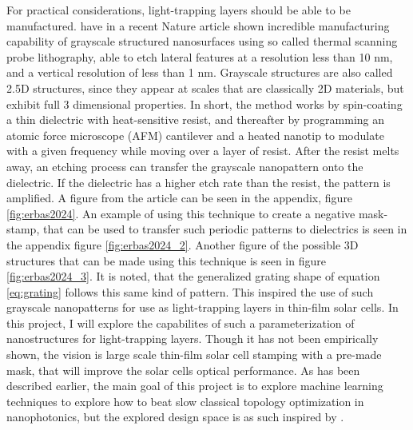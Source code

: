 For practical considerations, light-trapping layers should be able to be manufactured. \Cite{Erbas2024} have in a recent Nature article shown incredible manufacturing capability of grayscale structured nanosurfaces using so called thermal scanning probe lithography, able to etch lateral features at a resolution less than 10 nm, and a vertical resolution of less than 1 nm. Grayscale structures are also called 2.5D structures, since they appear at scales that are classically 2D materials, but exhibit full 3 dimensional properties.
In short, the method works by spin-coating a thin dielectric with heat-sensitive resist, and thereafter by programming an atomic force microscope (AFM) cantilever and a heated nanotip to modulate with a given frequency while moving over a layer of resist. After the resist melts away, an etching process can transfer the grayscale nanopattern onto the dielectric. If the dielectric has a higher etch rate than the resist, the pattern is amplified. A figure from the article can be seen in the appendix, figure \ref{fig:erbas2024}.
An example of using this technique to create a negative mask-stamp, that can be used to transfer such periodic patterns to dielectrics is seen in the appendix figure \ref{fig:erbas2024_2}.
Another figure of the possible 3D structures that can be made using this technique is seen in figure \ref{fig:erbas2024_3}. It is noted, that the generalized grating shape of equation \ref{eq:grating} follows this same kind of pattern.
This inspired the use of such grayscale nanopatterns for use as light-trapping layers in thin-film solar cells. In this project, I will explore the capabilites of such a parameterization of nanostructures for light-trapping layers.
Though it has not been empirically shown, the vision is large scale thin-film solar cell stamping with a pre-made mask, that will improve the solar cells optical performance.
As has been described earlier, the main goal of this project is to explore machine learning techniques to explore how to beat slow classical topology optimization in nanophotonics, but the explored design space is as such inspired by \cite{Erbas2024}.

